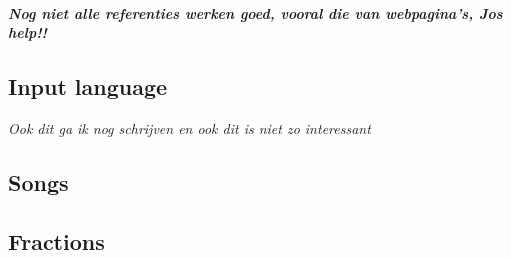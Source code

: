 \documentclass[a4paper]{article}
\begin{document}
\paragraph{\textit{\color{red}Nog niet alle referenties werken goed, vooral die van webpagina's, Jos help!!}}


\begin{appendices}

\section{Input language}
\label{input}

\textit{\color{red}Ook dit ga ik nog schrijven en ook dit is niet zo interessant}
\subsection{Songs}
\label{input_songs}
\subsection{Fractions}
\label{input_fractions}

\end{appendices}
\end{document}
